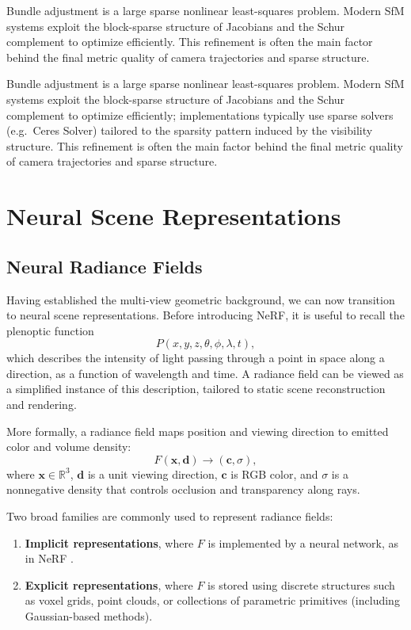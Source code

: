 \documentclass{report}
\begin{document}
Bundle adjustment is a large sparse nonlinear least-squares problem. Modern SfM systems exploit the block-sparse structure of Jacobians and the Schur complement to optimize efficiently. This refinement is often the main factor behind the final metric quality of camera trajectories and sparse structure.

Bundle adjustment is a large sparse nonlinear least-squares problem. Modern SfM systems exploit the block-sparse structure of Jacobians and the Schur complement to optimize efficiently; implementations typically use sparse solvers (e.g.\ Ceres Solver) tailored to the sparsity pattern induced by the visibility structure. This refinement is often the main factor behind the final metric quality of camera trajectories and sparse structure.


\section{Neural Scene Representations}
\subsection{Neural Radiance Fields}
Having established the multi-view geometric background, we can now transition to neural scene representations. Before introducing NeRF, it is useful to recall the plenoptic function
\[
P(x,y,z,\theta,\phi,\lambda,t),
\]
which describes the intensity of light passing through a point in space along a direction, as a function of wavelength and time. A radiance field can be viewed as a simplified instance of this description, tailored to static scene reconstruction and rendering.

More formally, a radiance field maps position and viewing direction to emitted color and volume density:
\[
F(\mathbf{x},\mathbf{d}) \rightarrow (\mathbf{c},\sigma),
\]
where $\mathbf{x}\in\mathbb{R}^3$, $\mathbf{d}$ is a unit viewing direction, $\mathbf{c}$ is RGB color, and $\sigma$ is a nonnegative density that controls occlusion and transparency along rays.

Two broad families are commonly used to represent radiance fields:
\begin{enumerate}
    \item \textbf{Implicit representations}, where $F$ is implemented by a neural network, as in NeRF \cite{mildenhall2020nerf}.
    \item \textbf{Explicit representations}, where $F$ is stored using discrete structures such as voxel grids, point clouds, or collections of parametric primitives (including Gaussian-based methods).
\end{enumerate}
\end{document}
